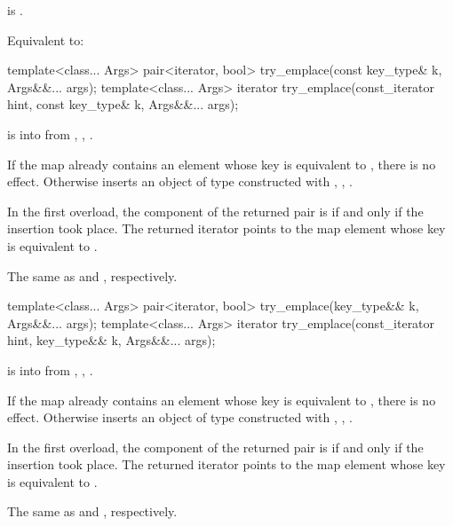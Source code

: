 \begin{itemdescr}
\pnum
\constraints
{} is .

\pnum
\effects
Equivalent to:
\end{itemdescr}

%
\begin{itemdecl}
template<class... Args>
  pair<iterator, bool> try_emplace(const key_type& k, Args&&... args);
template<class... Args>
  iterator try_emplace(const_iterator hint, const key_type& k, Args&&... args);
\end{itemdecl}

\begin{itemdescr}
\pnum
\expects
{} is  into 
from , ,
.

\pnum
\effects
If the map already contains an element
whose key is equivalent to ,
there is no effect.
Otherwise inserts an object of type 
constructed with , ,
.

\pnum
\returns
In the first overload,
the  component of the returned pair is 
if and only if the insertion took place.
The returned iterator points to the map element
whose key is equivalent to .

\pnum
\complexity
The same as  and ,
respectively.
\end{itemdescr}

%
\begin{itemdecl}
template<class... Args>
  pair<iterator, bool> try_emplace(key_type&& k, Args&&... args);
template<class... Args>
  iterator try_emplace(const_iterator hint, key_type&& k, Args&&... args);
\end{itemdecl}

\begin{itemdescr}
\pnum
\expects
{} is  into 
from , ,
.

\pnum
\effects
If the map already contains an element
whose key is equivalent to ,
there is no effect.
Otherwise inserts an object of type 
constructed with , ,
.

\pnum
\returns
In the first overload,
the  component of the returned pair is 
if and only if the insertion took place.
The returned iterator points to the map element
whose key is equivalent to .

\pnum
\complexity
The same as  and ,
respectively.
\end{itemdescr}

